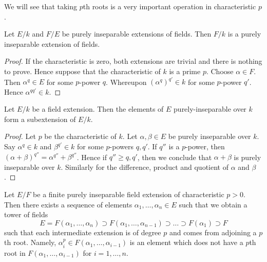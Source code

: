 \noindent
We will see that taking $p$th roots is a very important operation in
characteristic $p$.

\begin{lemma}
\label{lemma-purely-inseparable-permanence}
Let $E/k$ and $F/E$ be purely inseparable extensions of fields. Then $F/k$
is a purely inseparable extension of fields.
\end{lemma}

\begin{proof}
If the characteristic is zero, both extensions are trivial and there is nothing to prove. Hence suppose that the characteristic of $k$ is a prime $p$. Choose $\alpha \in F$. Then
$\alpha^q \in E$ for some $p$-power $q$. Whereupon $(\alpha^q)^{q'} \in k$
for some $p$-power $q'$. Hence $\alpha^{qq'} \in k$.
\end{proof}

\begin{lemma}
\label{lemma-purely-inseparable-elements}
Let $E/k$ be a field extension. Then the elements of $E$ purely-inseparable
over $k$ form a subextension of $E/k$.
\end{lemma}

\begin{proof}
Let $p$ be the characteristic of $k$.
Let $\alpha, \beta \in E$ be purely inseparable over $k$. Say
$\alpha^q \in k$ and $\beta^{q'} \in k$ for some $p$-powers $q, q'$.
If $q''$ is a $p$-power, then
$(\alpha + \beta)^{q''} = \alpha^{q''} + \beta^{q''}$.
Hence if $q'' \geq q, q'$, then we conclude that $\alpha + \beta$
is purely inseparable over $k$. Similarly for the difference,
product and quotient of $\alpha$ and $\beta$.
\end{proof}

\begin{lemma}
\label{lemma-finite-purely-inseparable}
Let $E/F$ be a finite purely inseparable field extension of
characteristic $p > 0$. Then there exists a sequence of elements
$\alpha_1, \ldots, \alpha_n \in E$ such that we obtain a tower
of fields
$$
E = F(\alpha_1, \ldots, \alpha_n) \supset
F(\alpha_1, \ldots, \alpha_{n - 1}) \supset
\ldots
\supset F(\alpha_1) \supset F
$$
such that each intermediate extension is of degree $p$ and comes
from adjoining a $p$th root. Namely,
$\alpha_i^p \in F(\alpha_1, \ldots, \alpha_{i - 1})$
is an element which does not have a $p$th root in
$F(\alpha_1, \ldots, \alpha_{i - 1})$ for $i = 1, \ldots, n$.
\end{lemma}

